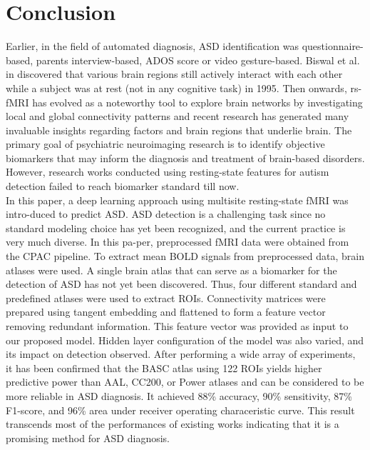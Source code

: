 \section{Conclusion}
Earlier, in the field of automated diagnosis, ASD identification was questionnaire-based,
parents interview-based, ADOS score or video gesture-based. Biswal et al. in \cite{biswal2012resting} discovered
that various brain regions still actively interact with each other while a subject was at rest (not
in any cognitive task) in 1995. Then onwards, rs-fMRI has evolved as a noteworthy tool to
explore brain networks by investigating local and global connectivity patterns and recent
research has generated many invaluable insights regarding factors and brain regions that
underlie brain. The primary goal of psychiatric neuroimaging research is to identify objective
biomarkers that may inform the diagnosis and treatment of brain-based disorders. However,
research works conducted using resting-state features for autism detection failed to reach
biomarker standard till now.\\

In this paper, a deep learning approach using multisite resting-state fMRI was intro-duced to predict ASD. ASD detection is a challenging task since no standard modeling choice has yet been recognized, and the current practice is very much diverse. In this pa-per, preprocessed fMRI data were obtained from the CPAC pipeline. To extract mean BOLD signals from preprocessed data, brain atlases were used. A single brain atlas that can serve as a biomarker for the detection of ASD has not yet been discovered. Thus, four different standard and predefined atlases were used to extract ROIs. Connectivity matrices were prepared using tangent embedding and flattened to form a feature vector removing redundant information. This feature vector was provided as input to our proposed model. Hidden layer configuration of the model was also varied, and its impact on detection observed. After performing a wide array of experiments, it has been confirmed that the BASC atlas using 122 ROIs yields higher predictive power than AAL, CC200, or Power atlases and can be considered to be more reliable in ASD diagnosis. It achieved 88\% accuracy, 90\% sensitivity, 87\% F1-score, and 96\% area under receiver operating characeristic curve. This result transcends most of the performances of existing works indicating that it is a promising method for ASD diagnosis. 

